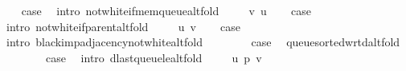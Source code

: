 \begin{isabellebody}
\ \ \isamarkupfalse%
\ {\isacharquery}{\kern0pt}case\ \isamarkupfalse%
\ {\isacharparenleft}{\kern0pt}intro\ not{\isacharunderscore}{\kern0pt}white{\isacharunderscore}{\kern0pt}if{\isacharunderscore}{\kern0pt}mem{\isacharunderscore}{\kern0pt}queue{\isacharunderscore}{\kern0pt}alt{\isacharunderscore}{\kern0pt}fold{\isacharparenright}{\kern0pt}\isanewline
{}\isamarkupfalse%
\isanewline
\ \ \isamarkupfalse%
\ {\isacharparenleft}{\kern0pt}{}\ v\ u{\isacharparenright}{\kern0pt}\isanewline
\ \ \isamarkupfalse%
\ {\isacharquery}{\kern0pt}case\ \isamarkupfalse%
\ {\isacharparenleft}{\kern0pt}intro\ not{\isacharunderscore}{\kern0pt}white{\isacharunderscore}{\kern0pt}if{\isacharunderscore}{\kern0pt}parent{\isacharunderscore}{\kern0pt}alt{\isacharunderscore}{\kern0pt}fold{\isacharparenright}{\kern0pt}\isanewline
{}\isamarkupfalse%
\isanewline
\ \ \isamarkupfalse%
\ {\isacharparenleft}{\kern0pt}{}\ u\ v{\isacharparenright}{\kern0pt}\isanewline
\ \ \isamarkupfalse%
\ {\isacharquery}{\kern0pt}case\ \isamarkupfalse%
\ {\isacharparenleft}{\kern0pt}intro\ black{\isacharunderscore}{\kern0pt}imp{\isacharunderscore}{\kern0pt}adjacency{\isacharunderscore}{\kern0pt}not{\isacharunderscore}{\kern0pt}white{\isacharunderscore}{\kern0pt}alt{\isacharunderscore}{\kern0pt}fold{\isacharparenright}{\kern0pt}\isanewline
{}\isamarkupfalse%
\isanewline
\ \ \isamarkupfalse%
\ {}{}\isanewline
\ \ \isamarkupfalse%
\ {\isacharquery}{\kern0pt}case\ \isamarkupfalse%
\ queue{\isacharunderscore}{\kern0pt}sorted{\isacharunderscore}{\kern0pt}wrt{\isacharunderscore}{\kern0pt}d{\isacharunderscore}{\kern0pt}alt{\isacharunderscore}{\kern0pt}fold\ \isacommand{{\isachardot}{\kern0pt}}\isamarkupfalse%
\isanewline
{}\isamarkupfalse%
\isanewline
\ \ \isamarkupfalse%
\ {}{}\isanewline
\ \ \isamarkupfalse%
\ {\isacharquery}{\kern0pt}case\ \isamarkupfalse%
\ {\isacharparenleft}{\kern0pt}intro\ d{\isacharunderscore}{\kern0pt}last{\isacharunderscore}{\kern0pt}queue{\isacharunderscore}{\kern0pt}le{\isacharunderscore}{\kern0pt}alt{\isacharunderscore}{\kern0pt}fold{\isacharparenright}{\kern0pt}\isanewline
{}\isamarkupfalse%
\isanewline
\ \ \isamarkupfalse%
\ {\isacharparenleft}{\kern0pt}{}{}\ u\ p\ v{\isacharparenright}{\kern0pt}\isanewline

\end{isabellebody}
